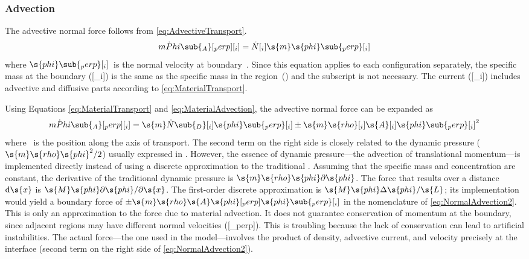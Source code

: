 \subsubsection{Advection}
\label{sec:NormalAdvection}

The advective normal force follows from \autoref{eq:AdvectiveTransport}.
\begin{equation}
  \label{eq:NormalAdvection}
  \dot{mPhi}\sub{_A}[_perp][_i] = \dot{N}[_i]\s{m}\s{phi}\sub{_perp}[_i]
\end{equation}
where $\s{phi}\sub{_perp}[_i]$~is the normal velocity at boundary~.  Since this equation applies to each configuration separately, the specific mass at the boundary ([_i]) is the same as the specific mass in the region~() and the subscript is not necessary.  The current ([_i]) includes advective and diffusive parts according to \autoref{eq:MaterialTransport}.


Using Equations \ref{eq:MaterialTransport} and \ref{eq:MaterialAdvection}, the advective normal force can be expanded as
\begin{equation}
  \label{eq:NormalAdvection2}
  \dot{mPhi}\sub{_A}[_perp][_i] = \s{m}\dot{N}\sub{_D}[_i]\s{phi}\sub{_perp}[_i] \pm \s{m}\s{rho}[_i]\s{A}[_i]\s{phi}\sub{_perp}[_i]^2
\end{equation}
where ~is the position along the axis of transport.  The second term on the right side is closely related to the dynamic pressure\label{mark:DynamicPressure} ($\s{m}\s{rho}\s{phi}^2/2$) usually expressed in .  However, the essence of dynamic pressure---the advection of translational momentum---is implemented directly instead of using a discrete approximation to the traditional .  Assuming that the specific mass and concentration are constant, the derivative of the traditional dynamic pressure is $\s{m}\s{rho}\s{phi}\partial\s{phi}$.  The force that results over a distance $\mathrm{d}\s{x}$ is $\s{M}\s{phi}\partial\s{phi}/\partial\s{x}$.  The first-order discrete approximation is $\s{M}\s{phi}\Delta\s{phi}/\s{L}$; its implementation would yield a boundary force of $\pm\s{m}\s{rho}\s{A}\s{phi}[_perp]\s{phi}\sub{_perp}[_i]$ in the nomenclature of \autoref{eq:NormalAdvection2}.  This is only an approximation to the force due to material advection.  It does not guarantee conservation of momentum at the boundary, since adjacent regions may have different normal velocities ([_perp]).  This is troubling because the lack of conservation can lead to artificial instabilities.  The actual force---the one used in the model---involves the product of density, advective current, and velocity precisely at the interface (second term on the right side of \autoref{eq:NormalAdvection2}).


